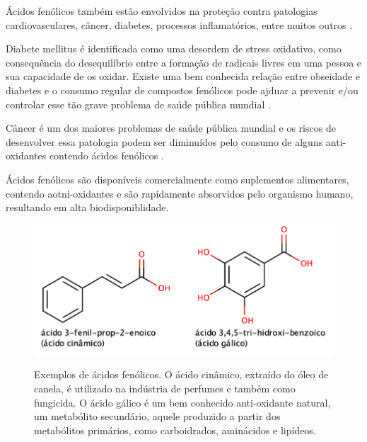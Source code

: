 Ácidos fenólicos também estão envolvidos na proteção contra patologias cardiovasculares, câncer, diabetes, processos inflamatórios, entre muitos outros \cite{robbins2003phenolic}.

Diabete mellitus é identificada como uma desordem de stress oxidativo, como consequência do desequilíbrio entre a formação de radicais livres em uma pessoa e sua capacidade de os oxidar. Existe uma bem conhecida relação entre obseidade e diabetes e o consumo regular de compostos fenólicos pode ajduar a prevenir e/ou controlar esse tão grave problema de saúde pública mundial \cite{furukawa114nakayama}.

Câncer é um dos maiores problemas de saúde pública mundial e os riscos de desenvolver essa patologia podem ser diminuídos pelo consumo de alguns anti-oxidantes contendo ácidos fenólicos \cite{kumar2017quantum}.

Ácidos fenólicos são disponíveis comercialmente como suplementos alimentares, contendo aotni-oxidantes e são rapidamente absorvidos pelo organismo humano, resultando em alta biodisponiblidade.

\begin{figure}[h]
	\centering
	\caption{Exemplos de ácidos fenólicos. O ácido cinâmico, extraído do óleo de canela, é utilizado na indústria de perfumes e também como fungicida. O ácido gálico é um bem conhecido anti-oxidante natural, um metabólito secundário, aquele produzido a partir dos metabólitos primários, como carboidrados, aminácidos e lipídeos.}
	\vspace{0.5cm}
	\includegraphics[width=0.75\linewidth]{imagens/acidosfenolicos.png}
	\label{fig:fenolicos}
\end{figure}
